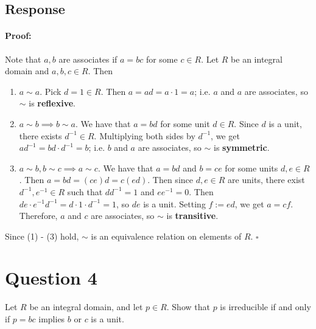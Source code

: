 \documentclass [12pt] {article}
\newenvironment{proof}{\paragraph{Proof:}}{\hfill$\square$}
\begin{document}
\subsection*{Response}
\begin{proof}
    Note that $a, b$ are associates if $a = bc$ for some $c \in R$.
    Let $R$ be an integral domain and $a, b, c \in R$. Then
    \begin{enumerate}[label=\textit{(\roman*)}]
        \item $a \sim a$. Pick $d = 1 \in R$. Then $a = ad = a \cdot 1 = a$; i.e. $a$ and
            $a$ are associates, so $\sim$ is \textbf{reflexive}.
        \item $a \sim b \implies b \sim a$. We have that $a = bd$ for some unit $d \in R$.
            Since $d$ is a unit, there exists $d^{-1} \in R$. Multiplying both sides by $d^{-1}$,
            we get $ad^{-1} = bd \cdot d^{-1} = b$; i.e. $b$ and $a$ are associates,
            so $\sim$ is \textbf{symmetric}.
        \item $a \sim b, b \sim c \implies a \sim c$. We have that $a = bd$ and $b = ce$
            for some units $d, e \in R$. Then $a = bd = (ce)d = c(ed)$. Then since $d, e \in R$ are
            units, there exist $d^{-1}, e^{-1} \in R$ such that $dd^{-1} = 1$ and $ee^{-1} = 0$.
            Then $de \cdot e^{-1}d^{-1} = d \cdot 1 \cdot d^{-1} = 1$, so $de$ is a unit.
            Setting $f := ed$, we get $a = cf$. Therefore, $a$ and $c$ are associates, so $\sim$ is
            \textbf{transitive}.
    \end{enumerate}
    Since (1) - (3) hold, $\sim$ is an equivalence relation on elements of $R$.
\end{proof}
\newpage


\section*{Question 4}
Let $R$ be an integral domain, and let $p\in R$. Show that $p$ is irreducible if and only if $p=bc$
implies $b$ or $c$ is a unit.
\end{document}
